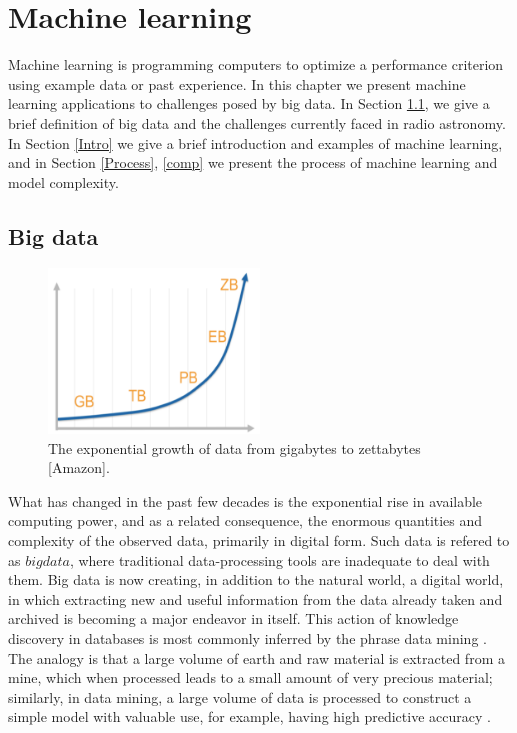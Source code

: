 
\chapter{Machine learning}
Machine learning is programming computers to optimize a performance
criterion using example data or past experience. In this chapter we present machine learning applications to challenges posed by big data. In Section \ref{BigD}, we give a brief definition of big data  and the challenges currently faced in radio astronomy. In Section \ref{Intro} we give a brief introduction and examples of machine learning,  and in Section \ref{Process}, \ref{comp} we  present the process of machine learning and model complexity.
\section{Big data}
\label{BigD}
\begin{figure}[H]
  \centering
    \includegraphics[width=0.5\textwidth]{images/Expgrowth.png}
    \caption{The exponential growth of data from gigabytes to zettabytes [Amazon].}
  \label{datagrowth.png}
\end{figure}
What has changed in the past few decades is the exponential rise in
available computing power, and as a related consequence, the enormous quantities and complexity of the observed data, primarily in digital form.  Such data is refered to as $big data$, where traditional data-processing tools are inadequate to deal with them. Big data is now creating, in addition to the natural world, a digital world, in which extracting new and useful information from the data already taken and archived is becoming a major endeavor in itself. This action of knowledge discovery in databases is most commonly inferred by the phrase data mining \citep{ball2010data}. The analogy is that a large volume of earth and raw material is extracted from a mine, which when processed leads to a small
amount of very precious material; similarly, in data mining, a large volume
of data is processed to construct a simple model with valuable use, for example, having high predictive accuracy \citep{alpaydin2014introduction}.

